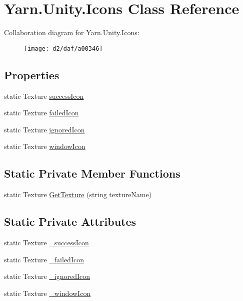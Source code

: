 \hypertarget{a00042}{\section{Yarn.\-Unity.\-Icons Class Reference}
\label{a00042}
}


Collaboration diagram for Yarn.\-Unity.\-Icons\-:
\nopagebreak
\begin{figure}[H]
\begin{center}
\leavevmode
\texttt{[image: d2/daf/a00346]}
\end{center}
\end{figure}
\subsection*{Properties}
\begin{DoxyCompactItemize}
\item 
static Texture \hyperlink{a00042_aec8aea03eb6e31771ebc98e0611fff79}{success\-Icon}
\item 
static Texture \hyperlink{a00042_aae7cc0e5016db04a90b2aa0e80957626}{failed\-Icon}
\item 
static Texture \hyperlink{a00042_a3f03f2f0fa137e349853d755e79f2e4a}{ignored\-Icon}
\item 
static Texture \hyperlink{a00042_aa78ab016ad041bc36850c8b20ba63972}{window\-Icon}
\end{DoxyCompactItemize}
\subsection*{Static Private Member Functions}
\begin{DoxyCompactItemize}
\item 
static Texture \hyperlink{a00042_a267896b2c4512f5b17772e7e1e46d6da}{Get\-Texture} (string texture\-Name)
\end{DoxyCompactItemize}
\subsection*{Static Private Attributes}
\begin{DoxyCompactItemize}
\item 
static Texture \hyperlink{a00042_a40e137f48495168d4423c103c8935a1b}{\-\_\-success\-Icon}
\item 
static Texture \hyperlink{a00042_a75ef0bcf3f5968f11949e6bfa4fdddd5}{\-\_\-failed\-Icon}
\item 
static Texture \hyperlink{a00042_aeb6761c6115d55f24df4ad963a2d224c}{\-\_\-ignored\-Icon}
\item 
static Texture \hyperlink{a00042_abba8fef6cc12836ea431a8a7c9e2f3db}{\-\_\-window\-Icon}
\end{DoxyCompactItemize}


